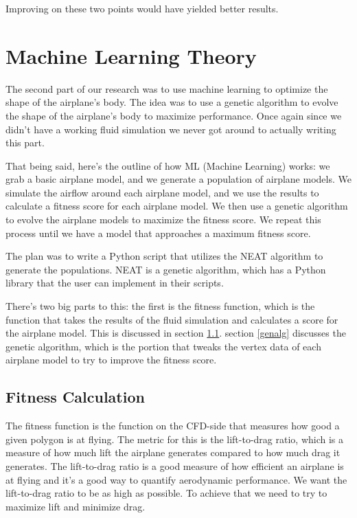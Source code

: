 \documentclass[a4paper,12pt,titlepage]{article}
\begin{document}
Improving on these two points would have yielded better results.

\pagebreak
\section{Machine Learning Theory}
The second part of our research was to use machine learning to optimize the shape
of the airplane's body. The idea was to use a genetic algorithm to evolve the
shape of the airplane's body to maximize performance. Once again since we didn't
have a working fluid simulation we never got around to actually writing this part.

That being said, here's the outline of how ML (Machine Learning) works: we grab
a basic airplane model, and we generate a population of airplane models. We
simulate the airflow around each airplane model, and we use the results to calculate
a fitness score for each airplane model. We then use a genetic algorithm to evolve
the airplane models to maximize the fitness score. We repeat this process until
we have a model that approaches a maximum fitness score.

The plan was to write a Python script that utilizes the NEAT algorithm to generate
the populations. NEAT is a genetic algorithm, which has a Python library that
the user can implement in their scripts.

There's two big parts to this: the first is the fitness function, which is the
function that takes the results of the fluid simulation and calculates a score
for the airplane model. This is discussed in section \ref{fitness}.
section \ref{genalg} discusses the genetic algorithm, which is the portion that tweaks
the vertex data of each airplane model to try to improve the fitness score.

\subsection{Fitness Calculation} \label{fitness}
The fitness function is the function on the CFD-side that measures how good a
given polygon is at flying. The metric for this is the lift-to-drag ratio, which
is a measure of how much lift the airplane generates compared to how much drag
it generates. The lift-to-drag ratio is a good measure of how efficient an airplane
is at flying and it's a good way to quantify aerodynamic performance. We want the
lift-to-drag ratio to be as high as possible. To achieve that we need to try
to maximize lift and minimize drag.
\end{document}

